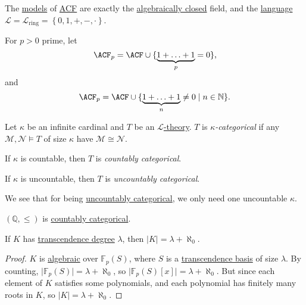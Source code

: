 \begin{remark}
	The \hyperref[def:model]{models} of \hyperref[def:ACF]{ACF} are exactly the \hyperref[def:algebraically-closed]{algebraically closed} field, and the \hyperref[def:language]{language} \(\mathcal{L} = \mathcal{L} _{\text{ring} } = \left\{ 0, 1, +, -, \cdot \right\} \).
\end{remark}

For \(p > 0\) prime, let
\[
	\ACF_p = \ACF \cup \{\underbrace{1+\ldots +1}_{p} = 0\},
\]
and
\[
	\ACF_p = \ACF \cup \{\underbrace{1+\ldots +1}_n \neq 0 \mid n\in \mathbb{N} \}.
\]

\begin{definition}[Categorical]\label{def:categorical}
	Let \(\kappa \) be an infinite cardinal and \(T\) be an \hyperref[def:theory]{\(\mathcal{L} \)-theory}. \(T\) is \emph{\(\kappa \)-categorical} if any \(\mathcal{M} , \mathcal{N} \models T\) of size \(\kappa \) have \(\mathcal{M} \cong \mathcal{N} \).

	\begin{definition}\label{def:countably-categorical}
		If \(\kappa \) is countable, then \(T\) is \emph{countably categorical}.
	\end{definition}
	\begin{definition}\label{def:uncountably-categorical}
		If \(\kappa \) is uncountable, then \(T\) is \emph{uncountably categorical}.
	\end{definition}
\end{definition}

We see that for being \hyperref[def:uncountably-categorical]{uncountably categorical}, we only need one uncountable \(\kappa \).

\begin{eg}
	\((\mathbb{Q} , \leq )\) is \hyperref[def:countably-categorical]{countably categorical}.
\end{eg}

\begin{lemma}\label{lma:lec12}
	If \(K\) has \hyperref[def:transcendence-degree]{transcendence degree} \(\lambda \), then \(\vert K \vert = \lambda + \aleph_0\).
\end{lemma}
\begin{proof}
	\(K\) is \hyperref[def:algebraic]{algebraic} over \(\mathbb{F} _p(S)\), where \(S\) is a \hyperref[def:transcendence-basis]{transcendence basis} of size \(\lambda \). By counting, \(\vert \mathbb{F} _p(S) \vert = \lambda + \aleph_0\), so \(\vert \mathbb{F} _p(S)[x] \vert = \lambda + \aleph_0\). But since each element of \(K\) satisfies some polynomials, and each polynomial has finitely many roots in \(K\), so \(\vert K \vert = \lambda +\aleph_0\).
\end{proof}

